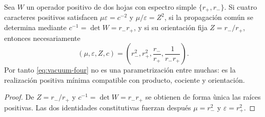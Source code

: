 \begin{proposition}
Sea \(W\) un operador positivo de dos hojas con espectro simple
\(\{r_+,r_-\}\). Si cuatro caracteres positivos satisfacen
\(\mu\varepsilon=c^{-2}\) y \(\mu/\varepsilon=Z^2\), si la propagaci\'on
com\'un se determina mediante \(c^{-1}=\det W=r_-r_+\), y si su orientaci\'on
fija \(Z=r_-/r_+\), entonces necesariamente
\[
(\mu,\varepsilon,Z,c)
=\left(r_-^2,r_+^2,\frac{r_-}{r_+},\frac1{r_-r_+}\right).
\]
Por tanto \cref{eq:vacuum-four} no es una parametrizaci\'on entre muchas:
es la realizaci\'on positiva m\'inima compatible con producto, cociente y
orientaci\'on.
\end{proposition}

\begin{proof}
De \(Z=r_-/r_+\) y \(c^{-1}=\det W=r_-r_+\) se obtienen de forma \`unica las
ra\'ices positivas. Las dos identidades constitutivas fuerzan despu\'es
\(\mu=r_-^2\) y \(\varepsilon=r_+^2\).
\end{proof}

